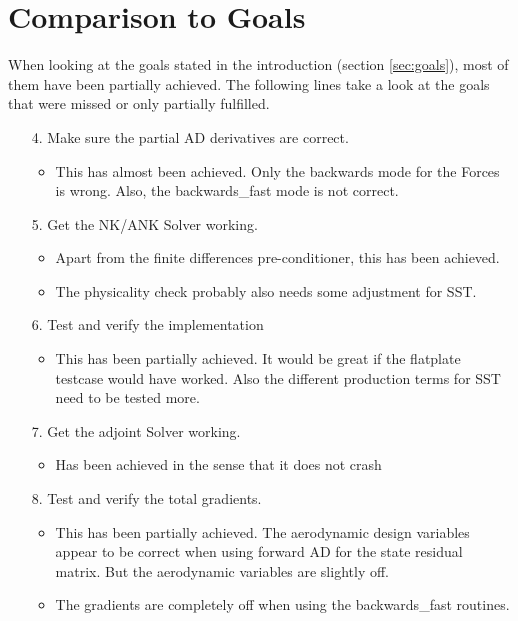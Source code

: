 \section{Comparison to Goals}
When looking at the goals stated in the introduction (section \ref{sec:goals}),
most of them have been partially achieved. The following lines take a look at
the goals that were missed or only partially fulfilled.

\begin{enumerate}

    \item[4.] Make sure the partial AD derivatives are correct. 
        \begin{itemize}
            \item This has almost been achieved. Only the backwards mode for
                the Forces is wrong. Also, the backwards\_fast mode is not
                correct.
        \end{itemize}

    \item[5.] Get the NK/ANK Solver working.
        \begin{itemize}
            \item Apart from the finite differences pre-conditioner, this has
                been achieved.

            \item The physicality check probably also needs some adjustment for
                SST.
        \end{itemize}

    \item[6.] Test and verify the implementation
        \begin{itemize}
            \item This has been partially achieved. It would be great if the
                flatplate testcase would have worked. Also the different
                production terms for SST need to be tested more.
        \end{itemize}

    \item[7.] Get the adjoint Solver working.
        \begin{itemize}
            \item Has been achieved in the sense that it does not crash 
        \end{itemize}

    \item[8.] Test and verify the total gradients.
        \begin{itemize}
            \item This has been partially achieved. The aerodynamic design
                variables appear to be correct when using forward AD for the
                state residual matrix. But the aerodynamic variables are
                slightly off. 

            \item The gradients are completely off when using the
                backwards\_fast routines.
        \end{itemize}
\end{enumerate}

